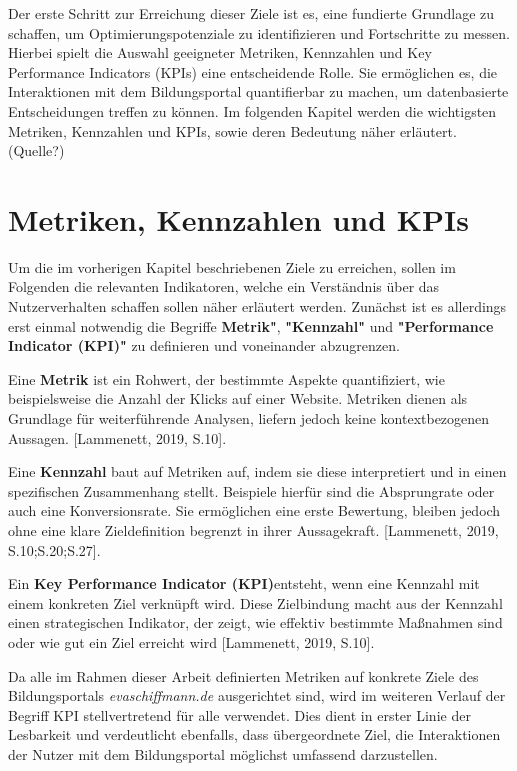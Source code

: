 Der erste Schritt zur Erreichung dieser Ziele ist es, eine fundierte Grundlage zu schaffen, um Optimierungspotenziale zu identifizieren und Fortschritte zu messen. Hierbei spielt die Auswahl geeigneter Metriken, Kennzahlen und Key Performance Indicators (KPIs) eine entscheidende Rolle. Sie ermöglichen es, die Interaktionen mit dem Bildungsportal quantifierbar zu machen, um datenbasierte Entscheidungen treffen zu können. Im folgenden Kapitel werden die wichtigsten Metriken, Kennzahlen und KPIs, sowie deren Bedeutung näher erläutert. (Quelle?)

\section{Metriken, Kennzahlen und KPIs} %
\label{sec:kpis}
Um die im vorherigen Kapitel beschriebenen Ziele zu erreichen, sollen im Folgenden die relevanten Indikatoren, welche ein Verständnis über das Nutzerverhalten schaffen sollen näher erläutert werden. Zunächst ist es allerdings erst einmal notwendig die Begriffe \textbf{ Metrik"}, \textbf{"Kennzahl"} und \textbf{"Performance Indicator (KPI)"} zu definieren und voneinander abzugrenzen.

Eine \textbf{Metrik} ist ein Rohwert, der bestimmte Aspekte quantifiziert, wie beispielsweise die Anzahl der Klicks auf einer Website. Metriken dienen als Grundlage für weiterführende Analysen, liefern jedoch keine kontextbezogenen Aussagen. [Lammenett, 2019, S.10].

Eine \textbf{Kennzahl} baut auf Metriken auf, indem sie diese interpretiert und in einen spezifischen Zusammenhang stellt. Beispiele hierfür sind die Absprungrate oder auch eine Konversionsrate. Sie ermöglichen eine erste Bewertung, bleiben jedoch ohne eine klare Zieldefinition begrenzt in ihrer Aussagekraft. [Lammenett, 2019, S.10;S.20;S.27].

Ein \textbf{Key Performance Indicator (KPI)}entsteht, wenn eine Kennzahl mit einem konkreten Ziel verknüpft wird. Diese Zielbindung macht aus der Kennzahl einen strategischen Indikator, der zeigt, wie effektiv bestimmte Maßnahmen sind oder wie gut ein Ziel erreicht wird [Lammenett, 2019, S.10].

Da alle im Rahmen dieser Arbeit definierten Metriken auf konkrete Ziele des Bildungsportals \textit{evaschiffmann.de} ausgerichtet sind, wird im weiteren Verlauf der Begriff KPI stellvertretend für alle verwendet. Dies dient in erster Linie der Lesbarkeit und verdeutlicht ebenfalls, dass übergeordnete Ziel, die Interaktionen der Nutzer mit dem Bildungsportal möglichst umfassend darzustellen.

